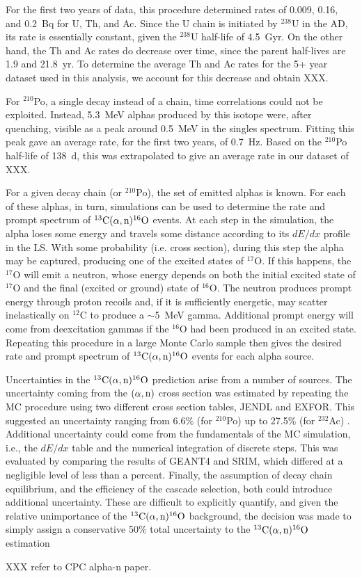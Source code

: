 \documentclass[../thesis.tex]{subfiles}
\begin{document}
For the first two years of data, this procedure determined rates of 0.009, 0.16, and 0.2~Bq for U, Th, and Ac. Since the U chain is initiated by $^{238}$U in the AD, its rate is essentially constant, given the $^{238}$U half-life of 4.5~Gyr. On the other hand, the Th and Ac rates do decrease over time, since the parent half-lives are 1.9 and 21.8~yr. To determine the average Th and Ac rates for the 5+ year dataset used in this analysis, we account for this decrease and obtain XXX.

For $^{210}$Po, a single decay instead of a chain, time correlations could not be exploited. Instead, 5.3~MeV alphas produced by this isotope were, after quenching, visible as a peak around 0.5~MeV in the singles spectrum. Fitting this peak gave an average rate, for the first two years, of 0.7~Hz. Based on the $^{210}$Po half-life of 138~d, this was extrapolated to give an average rate in our dataset of XXX.

For a given decay chain (or $^{210}$Po), the set of emitted alphas is known. For each of these alphas, in turn, simulations can be used to determine the rate and prompt spectrum of $^{13}\mathrm{C}(\alpha, \mathrm{n})^{16}\mathrm{O}$ events. At each step in the simulation, the alpha loses some energy and travels some distance according to its $dE/dx$ profile in the LS. With some probability (i.e. cross section), during this step the alpha may be captured, producing one of the excited states of $^{17}$O. If this happens, the $^{17}$O will emit a neutron, whose energy depends on both the initial excited state of $^{17}$O and the final (excited or ground) state of $^{16}$O. The neutron produces prompt energy through proton recoils and, if it is sufficiently energetic, may scatter inelastically on $^{12}$C to produce a $\sim$5~MeV gamma. Additional prompt energy will come from deexcitation gammas if the $^{16}$O had been produced in an excited state. Repeating this procedure in a large Monte Carlo sample then gives the desired rate and prompt spectrum of $^{13}\mathrm{C}(\alpha, \mathrm{n})^{16}\mathrm{O}$ events for each alpha source.

Uncertainties in the $^{13}\mathrm{C}(\alpha, \mathrm{n})^{16}\mathrm{O}$ prediction arise from a number of sources. The uncertainty coming from the $(\alpha,\mathrm{n})$ cross section was estimated by repeating the MC procedure using two different cross section tables, JENDL and EXFOR. This suggested an uncertainty ranging from 6.6\% (for $^{210}$Po) up to 27.5\% (for $^{232}$Ac) \cite{Zhao_2014}. Additional uncertainty could come from the fundamentals of the MC simulation, i.e., the $dE/dx$ table and the numerical integration of discrete steps. This was evaluated by comparing the results of GEANT4 and SRIM, which differed at a negligible level of less than a percent. Finally, the assumption of decay chain equilibrium, and the efficiency of the cascade selection, both could introduce additional uncertainty. These are difficult to explicitly quantify, and given the relative unimportance of the $^{13}\mathrm{C}(\alpha, \mathrm{n})^{16}\mathrm{O}$ background, the decision was made to simply assign a conservative 50\% total uncertainty to the $^{13}\mathrm{C}(\alpha, \mathrm{n})^{16}\mathrm{O}$ estimation

XXX refer to CPC alpha-n paper.
\end{document}
